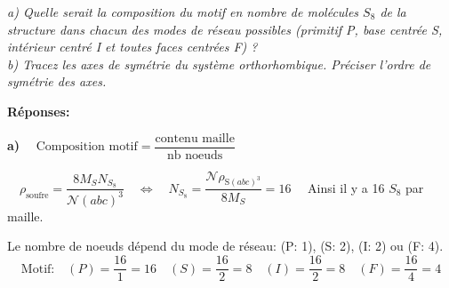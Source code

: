 \documentclass{article}
\begin{document}
\vspace{5mm}\noindent \textit{a) Quelle serait la composition du motif en nombre de molécules $S_8$ de la structure
dans chacun des modes de réseau possibles (primitif P, base centrée S, intérieur centré I et 
toutes faces centrées F) ? }\\
\textit{b) Tracez les axes de symétrie du système orthorhombique. Préciser l'ordre de symétrie des axes.}

\vspace{5mm}\noindent\textbf{Réponses:}

\textbf{a)} $\quad \text{Composition motif} = \dfrac{\text{contenu maille}}{\text{nb noeuds}}$

$\quad \rho_{\text{soufre}} = \dfrac{8 M_S N_{S_8}}{\mathcal{N}(a b c)^3}
\quad \Longleftrightarrow \quad N_{S_8}= \dfrac{\mathcal{N}\rho_{\text{S}(abc)^3}}{8M_S} = 16 \quad$
Ainsi il y a 16 $S_8$ par maille.

Le nombre de noeuds dépend du mode de réseau: (P: 1), (S: 2), (I: 2) ou (F: 4).
$$\text{Motif:} \quad (P) = \frac{16}{1}=16 \quad (S) = \frac{16}{2}=8 \quad (I) = \frac{16}{2}=8 \quad (F) = \frac{16}{4}=4$$



\clearpage
\end{document}
